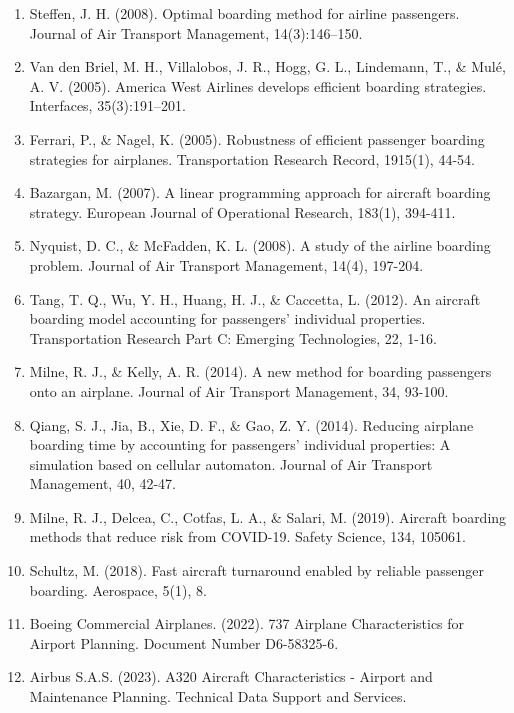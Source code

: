 \documentclass[12pt]{article}
\begin{document}
\begin{enumerate}
    \item Steffen, J. H. (2008). Optimal boarding method for airline passengers. Journal of Air Transport Management, 14(3):146–150.
    
    \item Van den Briel, M. H., Villalobos, J. R., Hogg, G. L., Lindemann, T., \& Mul\'e, A. V. (2005). America West Airlines develops efficient boarding strategies. Interfaces, 35(3):191–201.
    
    \item Ferrari, P., \& Nagel, K. (2005). Robustness of efficient passenger boarding strategies for airplanes. Transportation Research Record, 1915(1), 44-54.
    
    \item Bazargan, M. (2007). A linear programming approach for aircraft boarding strategy. European Journal of Operational Research, 183(1), 394-411.
    
    \item Nyquist, D. C., \& McFadden, K. L. (2008). A study of the airline boarding problem. Journal of Air Transport Management, 14(4), 197-204.
    
    \item Tang, T. Q., Wu, Y. H., Huang, H. J., \& Caccetta, L. (2012). An aircraft boarding model accounting for passengers' individual properties. Transportation Research Part C: Emerging Technologies, 22, 1-16.
    
    \item Milne, R. J., \& Kelly, A. R. (2014). A new method for boarding passengers onto an airplane. Journal of Air Transport Management, 34, 93-100.
    
    \item Qiang, S. J., Jia, B., Xie, D. F., \& Gao, Z. Y. (2014). Reducing airplane boarding time by accounting for passengers' individual properties: A simulation based on cellular automaton. Journal of Air Transport Management, 40, 42-47.
    
    \item Milne, R. J., Delcea, C., Cotfas, L. A., \& Salari, M. (2019). Aircraft boarding methods that reduce risk from COVID-19. Safety Science, 134, 105061.
    
    \item Schultz, M. (2018). Fast aircraft turnaround enabled by reliable passenger boarding. Aerospace, 5(1), 8.
    
    \item Boeing Commercial Airplanes. (2022). 737 Airplane Characteristics for Airport Planning. Document Number D6-58325-6.
    
    \item Airbus S.A.S. (2023). A320 Aircraft Characteristics - Airport and Maintenance Planning. Technical Data Support and Services.
\end{enumerate}
\end{document}
